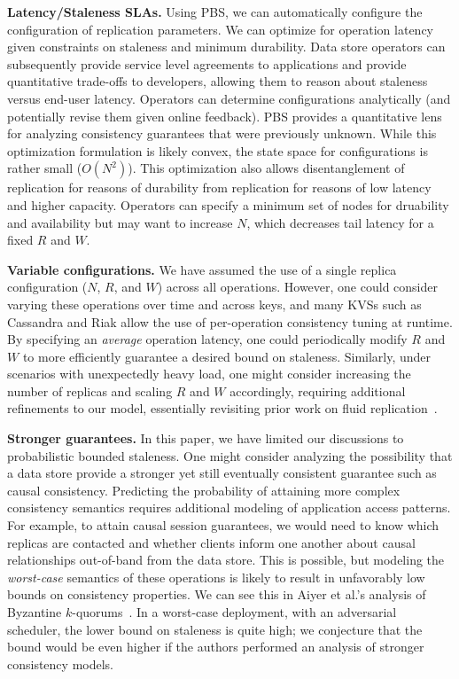 \documentclass{vldb}
\begin{document}
\textbf{Latency/Staleness SLAs.} Using PBS, we can automatically
configure the configuration of replication parameters.  We can
optimize for operation latency given constraints on staleness and
minimum durability.  Data store operators can subsequently provide
service level agreements to applications and provide quantitative
trade-offs to developers, allowing them to reason about staleness
versus end-user latency.  Operators can determine configurations
analytically (and potentially revise them given online feedback).  PBS
provides a quantitative lens for analyzing consistency guarantees that
were previously unknown.  While this optimization formulation is
likely convex, the state space for configurations is rather small
($O(N^2)$).  This optimization also allows disentanglement of
replication for reasons of durability from replication for reasons of
low latency and higher capacity.  Operators can specify a minimum set
of nodes for druability and availability but may want to increase $N$,
which decreases tail latency for a fixed $R$ and $W$.

\textbf{Variable configurations.} We have assumed the use of a single
replica configuration ($N$, $R$, and $W$) across all operations.
However, one could consider varying these operations over time and
across keys, and many KVSs such as Cassandra and Riak allow the use of
per-operation consistency tuning at runtime.  By specifying an
\textit{average} operation latency, one could periodically modify $R$ and $W$ to
more efficiently guarantee a desired bound on staleness.  Similarly,
under scenarios with unexpectedly heavy load, one might consider
increasing the number of replicas and scaling $R$ and $W$ accordingly,
requiring additional refinements to our model, essentially revisiting
prior work on fluid replication~\cite{fluidreplication}.

\textbf{Stronger guarantees.} In this paper, we have limited our
discussions to probabilistic bounded staleness.  One might consider
analyzing the possibility that a data store provide a stronger yet
still eventually consistent guarantee such as causal consistency.
Predicting the probability of attaining more complex consistency
semantics requires additional modeling of application access patterns.
For example, to attain causal session guarantees, we would need to
know which replicas are contacted and whether clients inform one
another about causal relationships out-of-band from the data store.
This is possible, but modeling the \textit{worst-case} semantics of
these operations is likely to result in unfavorably low bounds on
consistency properties.  We can see this in Aiyer et al.'s analysis of
Byzantine $k$-quorums~\cite{multi-k-quorum}.  In a worst-case
deployment, with an adversarial scheduler, the lower bound on
staleness is quite high; we conjecture that the bound would be even
higher if the authors performed an analysis of stronger consistency
models.
\end{document}
